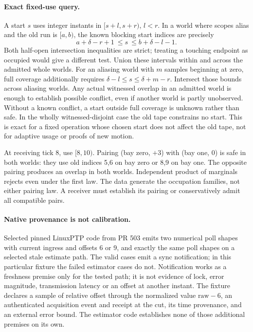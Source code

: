 \documentclass[11pt]{article}
\begin{document}
\paragraph{Exact fixed-use query.}
A start $s$ uses integer instants in $[s+l,s+r)$, $l<r$. In a
world where scopes alias and the old run is $[a,b)$, the known
blocking start indices are precisely
\[
 a+\delta-r+1\ \leq s\ \leq b+\delta-l-1 .
\]
Both half-open intersection inequalities are strict; treating a
touching endpoint as occupied would give a different test. Union
these intervals within and across the admitted whole worlds.
For an aliasing world with $m$ samples beginning at zero, full
coverage additionally requires $\delta-l\leq s\leq\delta+m-r$.
Intersect those bounds across aliasing worlds. Any actual witnessed
overlap in an admitted world is enough to establish possible
conflict, even if another world is partly unobserved. Without a
known conflict, a start outside full coverage is unknown rather
than safe. In the wholly witnessed-disjoint case the old tape
constrains no start. This is exact for a fixed operation whose
chosen start does not affect the old tape, not for adaptive usage
or proofs of new motion.

At receiving tick 8, use $[8,10)$. Pairing (bay zero, $+3$) with
(bay one, $0$) is safe in both worlds: they use old indices 5,6
on bay zero or 8,9 on bay one. The opposite pairing produces an
overlap in both worlds. Independent product of marginals rejects
even under the first law. The data generate the occupation families,
not either pairing law. A receiver must establish its pairing or
conservatively admit all compatible pairs.

\paragraph{Native provenance is not calibration.}
Selected pinned LinuxPTP code from PR 503 emits two numerical poll
shapes with current ingress and offsets 6 or 9, and exactly the
same poll shapes on a selected stale estimate path. The valid
cases emit a sync notification; in this particular fixture the
failed estimator cases do not. Notification works as a freshness
premise only for the tested path; it is not evidence of lock,
error magnitude, transmission latency or an offset at another
instant. The fixture declares a sample of relative offset through
the normalized value $\text{raw}-6$, an authenticated acquisition
event and receipt at the cut, its time provenance, and an external
error bound. The estimator code establishes none of those additional
premises on its own.
\end{document}
